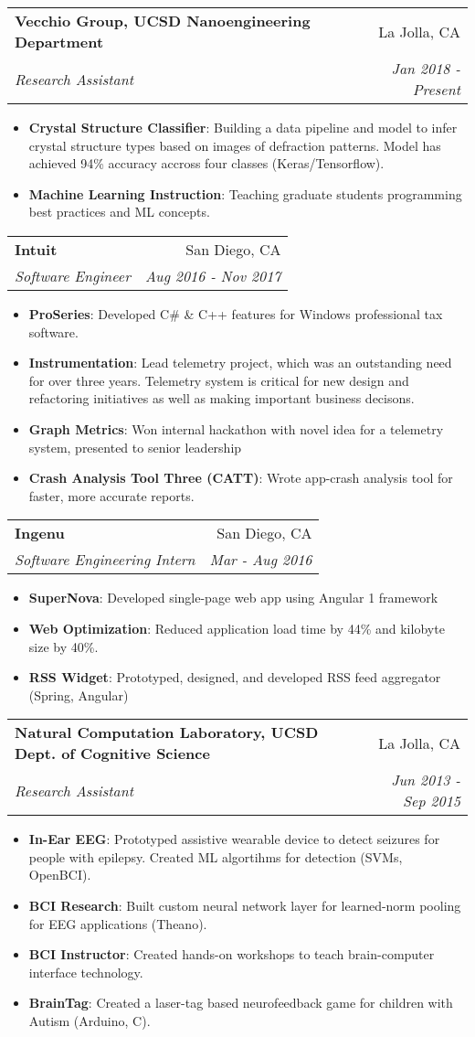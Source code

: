 \documentclass[letterpaper,11pt]{article}
\makeatletter
\newcommand{\resumeItem}[2]{
  \item\small{
    \textbf{#1}{: #2 \vspace{-2pt}}
  }
}
\newcommand{\resumeSubheading}[4]{
  \vspace{-1pt}\item
    \begin{tabular*}{0.97\textwidth}{l@{\extracolsep{\fill}}r}
      \textbf{#1} & #2 \\
      \textit{\small#3} & \textit{\small #4} \\
    \end{tabular*}\vspace{-5pt}
}
\newcommand{\resumeSubItem}[2]{\resumeItem{#1}{#2}\vspace{-4pt}}
\newcommand{\resumeItemListStart}{\begin{itemize}}
\newcommand{\resumeItemListEnd}{\end{itemize}\vspace{-5pt}}
\makeatother
\begin{document}
    \resumeSubheading
      {Vecchio Group, UCSD Nanoengineering Department}{La Jolla, CA}
      {Research Assistant}{Jan 2018 - Present}
      \resumeItemListStart
	\resumeSubItem{Crystal Structure Classifier}
	  {Building a data pipeline and model to infer crystal structure types based on images of defraction patterns. Model has achieved 94\% accuracy accross four classes (Keras/Tensorflow).}
        \resumeSubItem{Machine Learning Instruction}
	  {Teaching graduate students programming best practices and ML concepts.}
      \resumeItemListEnd

    \resumeSubheading
      {Intuit}{San Diego, CA}
      {Software Engineer}{Aug 2016 - Nov 2017}
      \resumeItemListStart
	\resumeSubItem{ProSeries}
 	  {Developed C\# \& C++ features for Windows professional tax software.}
        \resumeSubItem{Instrumentation}
	  {Lead telemetry project, which was an outstanding need for over three years. Telemetry system is critical for new design and refactoring initiatives as well as making important business decisons. }
        \resumeSubItem{Graph Metrics}
	  {Won internal hackathon with novel idea for a telemetry system, presented to senior leadership}
        \resumeSubItem{Crash Analysis Tool Three (CATT)}
	  {Wrote app-crash analysis tool for faster, more accurate reports.}
      \resumeItemListEnd

    \resumeSubheading
      {Ingenu}{San Diego, CA}
      {Software Engineering Intern}{Mar - Aug 2016}
      \resumeItemListStart
	\resumeSubItem{SuperNova}
 	  {Developed single-page web app using Angular 1 framework}
        \resumeSubItem{Web Optimization}
	  {Reduced application load time by 44\% and kilobyte size by 40\%.}
        \resumeSubItem{RSS Widget}
	  {Prototyped, designed, and developed RSS feed aggregator (Spring, Angular)}
      \resumeItemListEnd

    \resumeSubheading
      {Natural Computation Laboratory, UCSD Dept. of Cognitive Science}{La Jolla, CA}
      {Research Assistant}{Jun 2013 - Sep 2015}
      \resumeItemListStart
	\resumeSubItem{In-Ear EEG}
 	  {Prototyped assistive wearable device to detect seizures for people with epilepsy. Created ML algortihms for detection (SVMs, OpenBCI).}
        \resumeSubItem{BCI Research}
	  {Built custom neural network layer for learned-norm pooling for EEG applications (Theano).}
        \resumeSubItem{BCI Instructor}
	  {Created hands-on workshops to teach brain-computer interface technology.}
        \resumeSubItem{BrainTag}
	  {Created a laser-tag based neurofeedback game for children with Autism (Arduino, C).}
      \resumeItemListEnd
\end{document}
